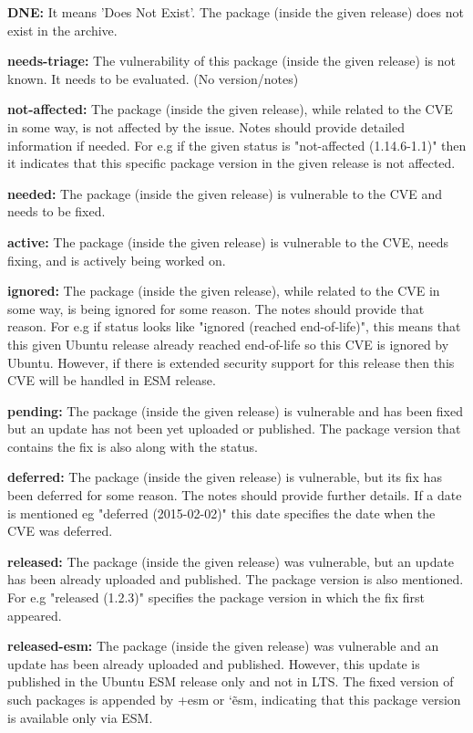 \documentclass[a4paper,num-refs]{oup-contemporary}
\begin{document}
\textbf{DNE:} It means 'Does Not Exist'. The package (inside the given release) does not exist in the
		archive.

\textbf{needs-triage:} The vulnerability of this package (inside the given release)
		is not known. It needs to be evaluated.  (No version/notes)

\textbf{not-affected:} The package (inside the given release), while related to the
		CVE in some way, is not affected by the issue. Notes should
		provide detailed information if needed. For e.g if the given
		status is "not-affected (1.14.6-1.1)" then it indicates that this specific
		package version in the given release is not affected.

\textbf{needed:} The package (inside the given release) is vulnerable to the
		CVE and needs to be fixed.

\textbf{active:} The package (inside the given release) is vulnerable to the
		CVE, needs fixing, and is actively being worked on.

\textbf{ignored:} The package (inside the given release), while related to the
		CVE in some way, is being ignored for some reason.  The
		notes should provide that reason. For e.g if status looks  like
		"ignored (reached end-of-life)", this means that this given Ubuntu release already reached
		end-of-life so this CVE is ignored by Ubuntu. However, if there
		is extended security support for this release then this
		CVE will be handled in ESM release.

\textbf{pending:} The package (inside the given release) is vulnerable and
                  has been fixed but an update has not been yet uploaded or
		  published. The package version that contains the fix is also
		  along with the status.

\textbf{deferred:} The package (inside the given release) is vulnerable, but 
                   its fix has been deferred for some reason. The notes
		   should provide further details. If a date is mentioned eg
		   "deferred (2015-02-02)" this date specifies the date when
		   the CVE was deferred.

\textbf{released:} The package (inside the given release) was vulnerable, but
		an update has been already uploaded and published. The package version
		is also mentioned. For e.g "released (1.2.3)"
		specifies the package version in which the fix first appeared.

\textbf{released-esm:} The package (inside the given release) was vulnerable and
		an update has been already uploaded and published. However,
		this update is published in the Ubuntu ESM release only and not in LTS.
		The fixed version of such packages is appended by
		+esm or \char`\~esm, indicating that this package version is available
		only via ESM.
\end{document}
